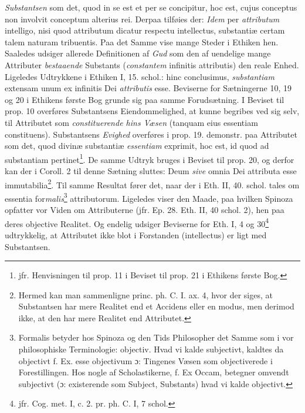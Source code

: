 \documentclass[12pt,a4paper]{book}
\newcommand{\opage}[1]{\marginnote{\footnotesize\textit{[#1]}}}
\begin{document}
\emph{Substantsen} som det, quod in se est et per se concipitur, hoc est,
cujus conceptus non involvit conceptum alterius rei. Derpaa tilføies
der: \emph{Idem} per \emph{attributum} intelligo, nisi quod attributum
dicatur respectu intellectus, substantiæ certam talem naturam
tribuentis. Paa det Samme vise mange Steder i Ethiken hen. Saaledes
udsiger allerede Definitionen af \emph{Gud} som den af uendelige mange
Attributer \emph{bestaaende} Substants (\emph{constantem} infinitis
attributis) den reale Enhed. Ligeledes Udtrykkene i Ethiken I, 15.
schol.: hinc conclusimus, \emph{substantiam} extensam unum ex infinitis
Dei \emph{attributis} esse. Beviserne for Sætningerne 10, 19 og 20 i Ethikens
første Bog grunde sig paa samme Forudsætning. I Beviset til prop. 10
overføres Substantsens Eiendommelighed, at kunne begribes ved sig selv,
til Attributet som \emph{constituerende hins Væsen} (tanquam eius
essentiam constituens). Substantsens \emph{Evighed} overføres i prop.
19. demonstr. paa Attributet som det, quod divinæ substantiæ \emph{essentiam}
exprimit, hoc est, id quod ad substantiam
pertinet\footnote{jfr. Henvisningen til prop. 11 i Beviset til prop. 21
i Ethikens første Bog.}. De samme Udtryk bruges i Beviset til prop. 20,
og derfor kan der i Coroll. 2 til denne Sætning sluttes: Deum \emph{sive}
omnia Dei attributa esse immutabilia\footnote{Hermed kan man
sammenligne princ. ph. C. I. ax. 4, hvor der siges, at Substantsen har
mere Realitet end et Accidens eller en modus, men derimod ikke, at den
har mere Realitet end Attributet.}. Til samme Resultat fører det, naar
der i Eth. II, 40. schol. tales om essentia
\opage{49} \setcounter{footnote}{0}%
for\emph{malis}\footnote{Formalis betyder hos Spinoza og den Tids Philosopher
det Samme som i vor philosophiske Terminologie: objectiv. Hvad vi kalde
subjectivt, kaldtes da objectivt f. Ex. esse objectivum ɔ: Tingenes
Væsen som objectiverede i Forestillingen. Hos nogle af Scholastikerne,
f. Ex Occam, betegner omvendt subjectivt (ɔ: existerende som Subject,
Substants) hvad vi kalde objectivt.} attributorum. Ligeledes viser den
Maade, paa hvilken Spinoza opfatter vor Viden om Attributerne (jfr. Ep.
28. Eth. II, 40 schol. 2), hen paa deres objective Realitet. Og endelig
udsiger Beviserne for Eth. I, 4 og 30\footnote{jfr. Cog. met. I, c. 2.
pr. ph. C. I, 7 schol.} udtrykkelig, at Attributet ikke blot i
Forstanden (intellectus) er ligt med Substantsen.
\end{document}
